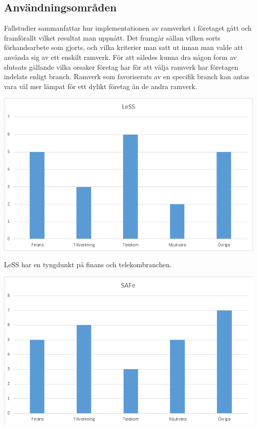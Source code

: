 	
	\subsection{Användningsområden}

	Fallstudier sammanfattar hur implementationen av ramverket i företaget gått och framförallt vilket resultat man uppnått. Det framgår sällan vilken sorts förhandsarbete som gjorts, och vilka kriterier man satt ut innan man valde att använda sig av ett enskilt ramverk.
	För att således kunna dra någon form av slutsats gällande vilka orsaker företag har för att välja ramverk har företagen indelats enligt branch.
	Ramverk som favoriserats av en specifik branch kan antas vara väl mer lämpat för ett dylikt företag än de andra ramverk.

	
	\begin{center}
		\includegraphics{Grafer/LeSS_brancher.png}
	\end{center}
	
	LeSS har en tyngdunkt på finans och telekombranchen.
		
	\begin{center}
		\includegraphics{Grafer/SAFe_brancher.png}
	\end{center}
	
